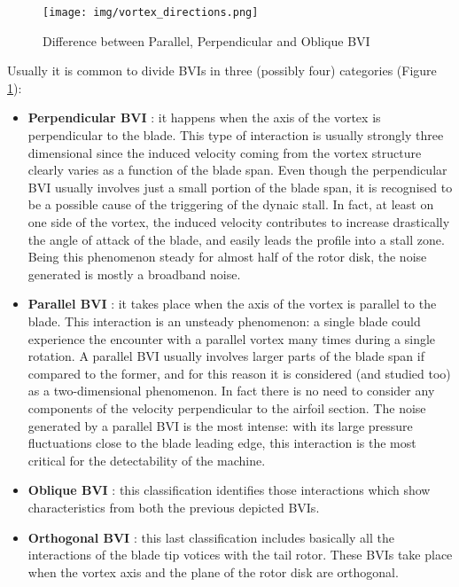 \begin{figure}
	\centering
	\texttt{[image: img/vortex\_directions.png]}
	\caption{Difference between Parallel, Perpendicular and Oblique BVI}
	\label{vdirection}
\end{figure}

Usually it is common to divide BVIs in three (possibly four) categories (Figure \ref{vdirection}): 

\begin{itemize}

	\item{\textbf{Perpendicular BVI}} : it happens when the axis of the vortex is perpendicular to the blade. This type of interaction is usually strongly three dimensional since the induced velocity coming from the vortex structure clearly varies as a function of the blade span. Even though the perpendicular BVI usually involves just a small portion of the blade span, it is recognised to be a possible cause of the triggering of the dynaic stall. In fact, at least on one side of the vortex, the induced velocity contributes to increase drastically the angle of attack of the blade, and easily leads the profile into a stall zone. Being this phenomenon steady for almost half of the rotor disk, the noise generated is mostly a broadband noise.
	
	\item{\textbf{Parallel BVI}} : it takes place when the axis of the vortex is parallel to the blade. This interaction is an unsteady phenomenon: a single blade could experience the encounter with a parallel vortex many times during a single rotation. A parallel BVI usually involves larger parts of the blade span if compared to the former, and for this reason it is considered (and studied too) as a two-dimensional phenomenon. In fact there is no need to consider any components of the velocity perpendicular to the airfoil section. The noise generated by a parallel BVI is the most intense: with its large pressure fluctuations close to the blade leading edge, this interaction is the most critical for the detectability of the machine. 
	
	\item{\textbf{Oblique BVI}} : this classification identifies those interactions which show characteristics from both the previous depicted BVIs.
	
	\item{\textbf{Orthogonal BVI}} : this last classification includes basically all the interactions of the blade tip votices with the tail rotor. These BVIs take place when the vortex axis and the plane of the rotor disk are orthogonal.

\end{itemize}


